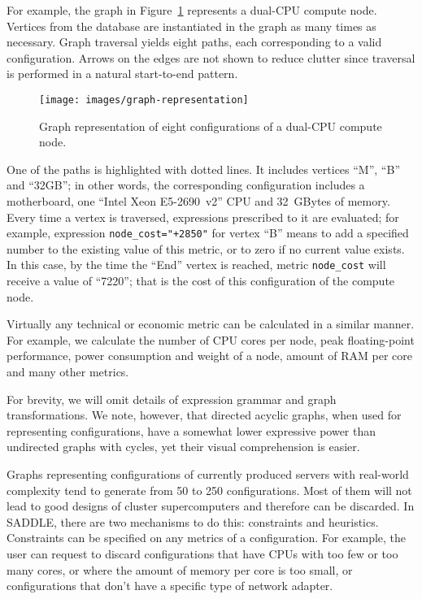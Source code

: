 \documentclass[runningheads,a4paper]{llncs}
\begin{document}
For example, the graph in Figure~\ref{graph-representation} represents a dual-CPU compute node. Vertices from the database are instantiated in the graph as many times as necessary. Graph traversal yields eight paths, each corresponding to a valid configuration. Arrows on the edges are not shown to reduce clutter since traversal is performed in a natural start-to-end pattern.

\begin{figure}
\centering
\texttt{[image: images/graph-representation]}
\caption{Graph representation of eight configurations of a dual-CPU compute node.}
\label{graph-representation}
\end{figure}

One of the paths is highlighted with dotted lines. It includes vertices ``M'', ``B'' and ``32GB''; in other words, the corresponding configuration includes a motherboard, one ``Intel Xeon E5-2690~v2'' CPU and 32~GBytes of memory. Every time a vertex is traversed, expressions prescribed to it are evaluated; for example, expression \verb|node_cost="+2850"| for vertex ``B'' means to add a specified number to the existing value of this metric, or to zero if no current value exists. In this case, by the time the ``End'' vertex is reached, metric \verb|node_cost| will receive a value of ``7220''; that is the cost of this configuration of the compute node.

Virtually any technical or economic metric can be calculated in a similar manner. For example, we calculate the number of CPU cores per node, peak floating-point performance, power consumption and weight of a node, amount of RAM per core and many other metrics.

For brevity, we will omit details of expression grammar and graph transformations. We note, however, that directed acyclic graphs, when used for representing configurations, have a somewhat lower expressive power than undirected graphs with cycles, yet their visual comprehension is easier.

Graphs representing configurations of currently produced servers with real-world complexity tend to generate from 50 to 250 configurations. Most of them will not lead to good designs of cluster supercomputers and therefore can be discarded. In SADDLE, there are two mechanisms to do this: constraints and heuristics. Constraints can be specified on any metrics of a configuration. For example, the user can request to discard configurations that have CPUs with too few or too many cores, or where the amount of memory per core is too small, or configurations that don't have a specific type of network adapter.
\end{document}
